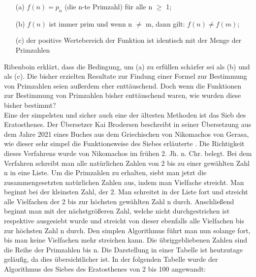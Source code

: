 \begin{itemize}
\item[ (a) ]  $f(n) = p_n$ (die n-te Primzahl) für alle n $\geq$ 1;
\item[ (b) ]  $f(n)$ ist immer prim und wenn n $\neq$ m, dann gilt: $f(n) \neq f(m)$;
\item[ (c) ]  der positive Wertebereich der Funktion ist identisch mit der Menge der Primzahlen
\end{itemize}

Ribenboin erklärt, dass die Bedingung, um (a) zu erfüllen schärfer sei als (b) und als (c). Die bisher erzielten Resultate zur Findung einer Formel zur Bestimmung von Primzahlen seien außerdem eher enttäuschend. Doch wenn die Funktionen zur Bestimmung von Primzahlen bisher enttäuschend waren, wie wurden diese bisher bestimmt?\\

Eine der simpelsten und sicher auch eine der ältesten Methoden ist das \glqq Sieb des Eratosthenes\grqq . Der Übersetzer Kai Brodersen beschreibt in seiner Übersetzung aus dem Jahre 2021 eines Buches aus dem Griechischen von Nikomachos von Gerasa, wie dieser sehr simpel die Funktionsweise des Siebes erläuterte \cite[S. 7]{Nikomachos.2021}. Die Richtigkeit dieses Verfahrens wurde von Nikomachos im frühen 2. Jh. n. Chr. belegt. Bei dem Verfahren schreibt man alle natürlichen Zahlen von 2 bis zu einer gewählten Zahl n in eine Liste. Um die Primzahlen zu erhalten, siebt man jetzt die zusammengesetzten natürlichen Zahlen aus, indem man Vielfache streicht. Man beginnt bei der kleinsten Zahl, der 2. Man schreitet in der Liste fort und streicht alle Vielfachen der 2 bis zur höchsten gewählten Zahl n durch. Anschließend beginnt man mit der nächstgrößeren Zahl, welche nicht durchgestrichen ist respektive ausgesiebt wurde und streicht von dieser ebenfalls alle Vielfachen bis zur höchsten Zahl n durch. Den simplen Algorithmus führt man nun solange fort, bis man keine Vielfachen mehr streichen kann. Die übriggebliebenen Zahlen sind die Reihe der Primzahlen bis n. Die Darstellung in einer Tabelle ist heutzutage geläufig, da dies übersichtlicher ist. In der folgenden Tabelle wurde der Algorithmus des Siebes des Eratosthenes von 2 bis 100 angewandt:\\

